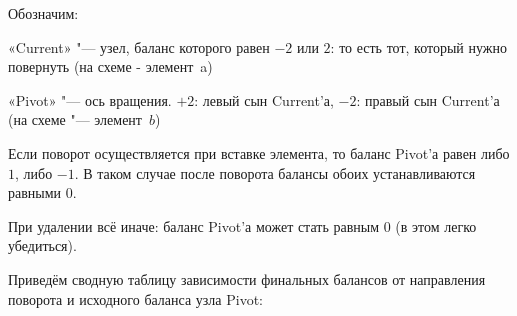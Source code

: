 Обозначим:

«Current» "--- узел, баланс которого равен $-2$ или $2$:
то есть тот, который нужно повернуть (на схеме - элемент a)

«Pivot» "--- ось вращения. $+2$: левый сын Current'а, $-2$: правый сын Current'а (на схеме "--- элемент $b$)

Если поворот осуществляется при вставке элемента, то баланс Pivot'а равен либо $1$, либо $-1$.
В таком случае после поворота балансы обоих устанавливаются равными $0$.

При удалении всё иначе: баланс Pivot'а может стать равным $0$ (в этом легко убедиться).

Приведём сводную таблицу зависимости финальных балансов от направления поворота и исходного баланса узла Pivot:

